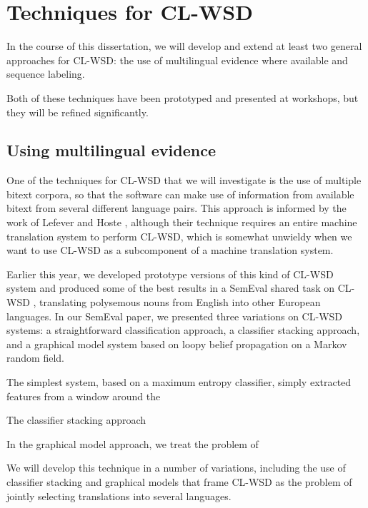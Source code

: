 \section{Techniques for CL-WSD}

In the course of this dissertation, we will develop and extend at least two
general approaches for CL-WSD: the use of multilingual evidence where
available and sequence labeling.

Both of these techniques have been prototyped and presented at workshops, but
they will be refined significantly.

\subsection{Using multilingual evidence}
One of the techniques for CL-WSD that we will investigate is the use of
multiple bitext corpora, so that the software can make use of information from
available bitext from several different language pairs.
This approach is informed by the work of Lefever and Hoste
\cite{lefever-hoste-decock:2011:ACL-HLT2011}, although their technique requires
an entire machine translation system to perform CL-WSD, which is somewhat
unwieldy when we want to use CL-WSD as a subcomponent of a machine translation
system.

Earlier this year, we developed prototype versions of this kind of CL-WSD system
\cite{rudnick-liu-gasser:2013:SemEval-2013} and produced some of the best
results in a SemEval shared task on CL-WSD \cite{task10}, translating
polysemous nouns from English into other European languages. In our SemEval
paper, we presented three variations on CL-WSD systems: a straightforward
classification approach, a classifier stacking approach, and a graphical model
system based on loopy belief propagation on a Markov random field.

The simplest system, based on a maximum entropy classifier, simply extracted
features from a window around the 

The classifier stacking approach

In the graphical model approach, we treat the problem of 


We will develop this technique in a number of variations, including the use of
classifier stacking and graphical models that frame CL-WSD as the problem
of jointly selecting translations into several languages.




